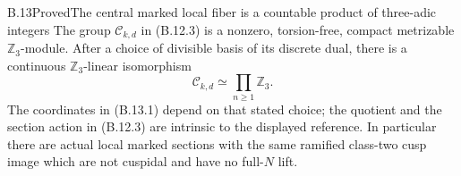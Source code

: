 \begin{statement}{B.13}{Proved}{The central marked local fiber is a countable product of three-adic integers}
The group $\mathcal C_{k,d}$ in (B.12.3) is a nonzero,
torsion-free, compact metrizable $\mathbb Z_3$-module.
After a choice of divisible basis of its discrete dual,
there is a continuous $\mathbb Z_3$-linear isomorphism
\[
                         \mathcal C_{k,d}
                                  \simeq\prod_{n\ge1}\mathbb Z_3 .
                                                               \tag{B.13.1}
\]
The coordinates in (B.13.1) depend on that stated choice;
the quotient and the section action in (B.12.3) are
intrinsic to the displayed reference.
In particular there are actual local marked sections
with the same ramified class-two cusp image which
are not cuspidal and have no full-$N$ lift.
\end{statement}
